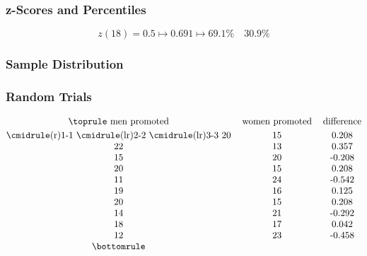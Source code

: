 \documentclass{beamer}
\begin{document}
\begin{frame}
  \frametitle{z-Scores and Percentiles}
  \centering
  \begin{equation*}
    z(18) = 0.5 \mapsto 0.691 \mapsto 69.1\% \quad 30.9\%
  \end{equation*}
\end{frame}

\begin{frame}
  \frametitle{Sample Distribution}
  \centering
\end{frame}

\begin{frame}
  \frametitle{Random Trials}
  \begin{displaymath}
    \begin{tabular}{@{}ccc@{}}
      \toprule
      men promoted & women promoted & difference \\[0.3em]
      \cmidrule(r){1-1} \cmidrule(lr){2-2} \cmidrule(lr){3-3}
      20 & 15 & 0.208 \\
      22 & 13 & 0.357 \\
      15 & 20 & -0.208 \\ 
      20 & 15 & 0.208 \\
      11 & 24 & -0.542 \\  
      19 & 16 & 0.125 \\
      20 & 15 & 0.208 \\ 
      14 & 21 & -0.292 \\
      18 & 17 & 0.042 \\  
      12 & 23 & -0.458 \\
      \bottomrule
    \end{tabular}
  \end{displaymath} 
\end{frame}
\end{document}
